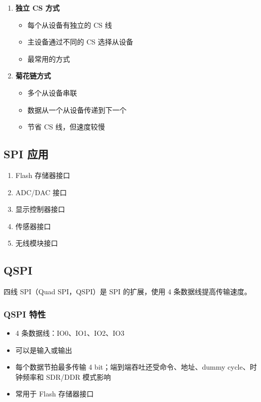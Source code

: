 \begin{enumerate}
  \item \textbf{独立 CS 方式}
    \begin{itemize}
      \item 每个从设备有独立的 CS 线
      \item 主设备通过不同的 CS 选择从设备
      \item 最常用的方式
    \end{itemize}

  \item \textbf{菊花链方式}
    \begin{itemize}
      \item 多个从设备串联
      \item 数据从一个从设备传递到下一个
      \item 节省 CS 线，但速度较慢
    \end{itemize}
\end{enumerate}

\subsection{SPI 应用}

\begin{enumerate}
  \item Flash 存储器接口
  \item ADC/DAC 接口
  \item 显示控制器接口
  \item 传感器接口
  \item 无线模块接口
\end{enumerate}

\subsection{QSPI}

四线 SPI（Quad SPI，QSPI）是 SPI 的扩展，使用 4 条数据线提高传输速度。

\subsubsection{QSPI 特性}

\begin{itemize}
  \item 4 条数据线：IO0、IO1、IO2、IO3
  \item 可以是输入或输出
  \item 每个数据节拍最多传输 4 bit；端到端吞吐还受命令、地址、dummy cycle、时钟频率和 SDR/DDR 模式影响
  \item 常用于 Flash 存储器接口
\end{itemize}

